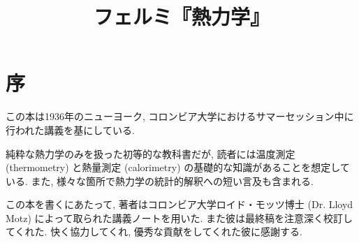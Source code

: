 \documentclass[10pt, a4paper, openany]{book}
\title{フェルミ『熱力学』}
\begin{document}
\maketitle
\frontmatter
\chapter{序}
この本は1936年のニューヨーク, コロンビア大学におけるサマーセッション中に行われた講義を基にしている.\par
純粋な熱力学のみを扱った初等的な教科書だが, 読者には温度測定 (thermometry) と熱量測定 (calorimetry) の基礎的な知識があることを想定している. また, 様々な箇所で熱力学の統計的解釈への短い言及も含まれる. \par
この本を書くにあたって, 著者はコロンビア大学ロイド・モッツ博士 (Dr. Lloyd Motz) によって取られた講義ノートを用いた. また彼は最終稿を注意深く校訂してくれた. 快く協力してくれ, 優秀な貢献をしてくれた彼に感謝する. 
%

\tableofcontents
\mainmatter


%
%
%
%
%
%
\end{document}
